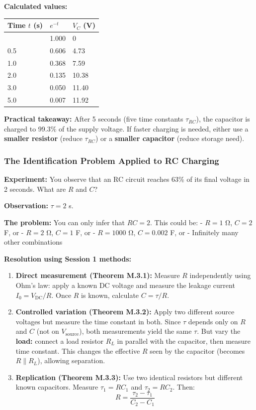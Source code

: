 \documentclass[
]{article}
\begin{document}
\textbf{Calculated values:}

\begin{longtable}[]{@{}lll@{}}
\toprule\noalign{}
Time \(t\) (s) & \(e^{-t}\) & \(V_C\) (V) \\
\midrule\noalign{}
\endhead
\bottomrule\noalign{}
\endlastfoot
0 & 1.000 & 0 \\
0.5 & 0.606 & 4.73 \\
1.0 & 0.368 & 7.59 \\
2.0 & 0.135 & 10.38 \\
3.0 & 0.050 & 11.40 \\
5.0 & 0.007 & 11.92 \\
\end{longtable}

\textbf{Practical takeaway:} After 5 seconds (five time constants
\(\tau_{RC}\)), the capacitor is charged to 99.3\% of the supply
voltage. If faster charging is needed, either use a \textbf{smaller
resistor} (reduce \(\tau_{RC}\)) or a \textbf{smaller capacitor} (reduce
storage need).

\subsubsection{The Identification Problem Applied to RC
Charging}\label{the-identification-problem-applied-to-rc-charging}

\textbf{Experiment:} You observe that an RC circuit reaches 63\% of its
final voltage in 2 seconds. What are \(R\) and \(C\)?

\textbf{Observation:} \(\tau = 2\) s.

\textbf{The problem:} You can only infer that \(RC = 2\). This could be:
- \(R = 1\) Ω, \(C = 2\) F, or - \(R = 2\) Ω, \(C = 1\) F, or -
\(R = 1000\) Ω, \(C = 0.002\) F, or - Infinitely many other combinations

\textbf{Resolution using Session 1 methods:}

\begin{enumerate}
\def\labelenumi{\arabic{enumi}.}
\item
  \textbf{Direct measurement (Theorem M.3.1):} Measure \(R\)
  independently using Ohm's law: apply a known DC voltage and measure
  the leakage current \(I_0 = V_{\text{DC}}/R\). Once \(R\) is known,
  calculate \(C = \tau / R\).
\item
  \textbf{Controlled variation (Theorem M.3.2):} Apply two different
  source voltages but measure the time constant in both. Since \(\tau\)
  depends only on \(R\) and \(C\) (not on \(V_{\text{source}}\)), both
  measurements yield the same \(\tau\). But vary the \textbf{load:}
  connect a load resistor \(R_L\) in parallel with the capacitor, then
  measure time constant. This changes the effective \(R\) seen by the
  capacitor (becomes \(R \parallel R_L\)), allowing separation.
\item
  \textbf{Replication (Theorem M.3.3):} Use two identical resistors but
  different known capacitors. Measure \(\tau_1 = RC_1\) and
  \(\tau_2 = RC_2\). Then: \[R = \frac{\tau_2 - \tau_1}{C_2 - C_1}\]
\end{enumerate}
\end{document}
